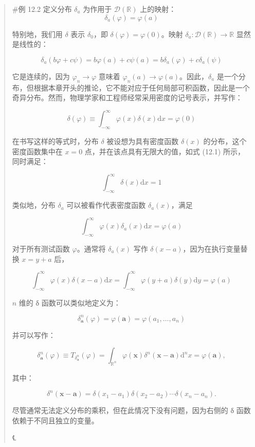 \begin{quote}
\#例 12.2 定义分布 \(\delta_{a}\) 为作用于
\(\mathcal{D}\left( \mathbb{R} \right)\) 上的映射：
\label{ux4f8b-12.2-ux5b9aux4e49ux5206ux5e03-delta_a-ux4e3aux4f5cux7528ux4e8e-mathcaldmathbbr-ux4e0aux7684ux6620ux5c04}{}
\[\delta_{a}(\varphi) = \varphi(a)\]

特别地，我们用 \(\delta\) 表示 \(\delta_{0}\)，即
\(\delta(\varphi) = \varphi(0)\)。映射
\(\delta_{a}:\mathcal{D}\left( \mathbb{R} \right) \rightarrow \mathbb{R}\)
显然是线性的：

\[\delta_{a}(b\varphi + c\psi) = b\varphi(a) + c\psi(a) = b\delta_{a}(\varphi) + c\delta_{a}(\psi)\]

它是连续的，因为 \(\varphi_{n} \rightarrow \varphi\) 意味着
\(\varphi_{n}(a) \rightarrow \varphi(a)\)。因此，\(\delta_{a}\)
是一个分布，但根据本章开头的推论，它不能对应于任何局部可积函数，因此是一个奇异分布。然而，物理学家和工程师经常采用密度的记号表示，并写作：

\[\delta(\varphi) \equiv \int_{- \infty}^{\infty}\varphi(x)\delta(x)\mathrm{d}x = \varphi(0)\]

在书写这样的等式时，分布 \(\delta\) 被设想为具有密度函数 \(\delta(x)\)
的分布，这个密度函数集中在 \(x = 0\) 点，并在该点具有无限大的值，如式
(12.1) 所示，同时满足：

\[\int_{- \infty}^{\infty}\delta(x)\mathrm{d}x = 1\]

类似地，分布 \(\delta_{a}\) 可以被看作代表密度函数
\(\delta_{a}(x)\)，满足

\[\int_{- \infty}^{\infty}\varphi(x)\delta_{a}(x)\mathrm{d}x = \varphi(a)\]

对于所有测试函数 \(\varphi\)。通常将 \(\delta_{a}(x)\) 写作
\(\delta(x - a)\)，因为在执行变量替换 \(x = y + a\) 后，

\[\int_{- \infty}^{\infty}\varphi(x)\delta(x - a)\mathrm{d}x = \int_{- \infty}^{\infty}\varphi(y + a)\delta(y)\mathrm{d}y = \varphi(a)\]

\(n\) 维的 δ 函数可以类似地定义为：

\[\delta_{\mathbf{a}}^{n}(\varphi) = \varphi\left( \mathbf{a} \right) = \varphi\left( a_{1},\ldots,a_{n} \right)\]

并可以写作：

\[\delta_{\mathbf{a}}^{n}(\varphi) \equiv T_{\delta_{\mathbf{a}}^{n}}(\varphi) = \int_{\mathbb{R}^{n}}\varphi\left( \mathbf{x} \right)\delta^{n}\left( \mathbf{x} - \mathbf{a} \right)\mathrm{d}^{n}x = \varphi\left( \mathbf{a} \right),\]

其中：

\[\delta^{n}\left( \mathbf{x} - \mathbf{a} \right) = \delta\left( x_{1} - a_{1} \right)\delta\left( x_{2} - a_{2} \right)\cdots\delta\left( x_{n} - a_{n} \right).\]

尽管通常无法定义分布的乘积，但在此情况下没有问题，因为右侧的 δ
函数依赖于不同且独立的变量。

℄~
\end{quote}


